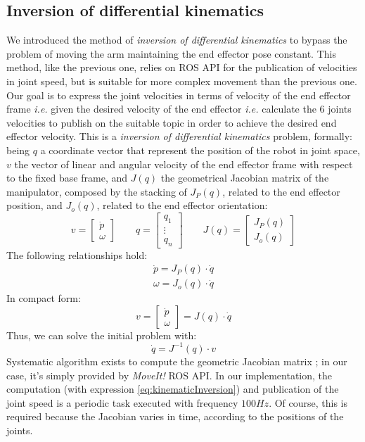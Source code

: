 \subsection{Inversion of differential kinematics}
We introduced the method of \textit{inversion of differential kinematics} to bypass the problem of moving the arm maintaining the end effector pose constant. This method, like the previous one, relies on \ac{ROS} \ac{API} for the publication of velocities in joint speed, but is suitable for more complex movement than the previous one. Our goal is to express the joint velocities in terms of velocity of the end effector frame \textit{i.e.} given the desired velocity of the end effector \textit{i.e.} calculate the 6 joints velocities to publish on the suitable topic in order to achieve the desired end effector velocity. 
This is a \textit{inversion of differential kinematics} problem, formally: being $q$ a coordinate vector that represent the position of the robot in joint space, 
$v$ the vector of linear and angular velocity of the end effector frame with respect to the fixed base frame, and $J(q)$ the geometrical Jacobian matrix of the manipulator, composed by the stacking of $J_P(q)$, related to the end effector position, and $J_o(q)$, related to the end effector orientation: 
\[
v = \left[\begin{array}{c}\dot{p} \\ \omega\end{array}\right] 	\qquad
q = \left[\begin{array}{c} q_1 \\ \vdots \\ q_n \end{array}\right]	\qquad
J(q) =  \left[\begin{array}{c} J_P(q) \\ J_o(q) \end{array}\right]
\]
 The following relationships hold: \\
 \begin{align*}
 \dot{p} = J_P(q)\cdot\dot{q} \\
 \omega = J_o(q)\cdot\dot{q} 
\end{align*}
In compact form:
\[
v = \left[\begin{array}{c}\dot{p} \\ \omega\end{array}\right] = J(q)\cdot\dot{q}
\]
Thus, we can solve the initial problem with: \\
\begin{equation}\label{eq:kinematicInversion}
\dot{q} = J^{-1}(q)\cdot v
\end{equation}
Systematic algorithm exists to compute the geometric Jacobian matrix \parencite{jacobian}; in our case, it's simply provided by \textit{MoveIt!} \ac{ROS} \ac{API}. 
In our implementation, the computation (with expression \ref{eq:kinematicInversion}) and publication of the joint speed is a periodic task executed with frequency $100Hz$. Of course, this is required because the Jacobian varies in time, according to the positions of the joints.


